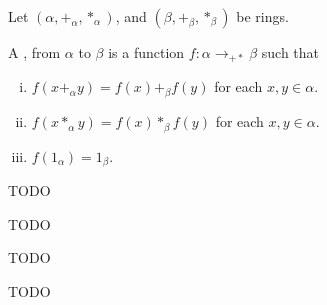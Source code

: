\begin{definition}
    \label{RingHom}

    Let $(\alpha, +_\alpha, *_\alpha)$, and $(\beta, +_\beta, *_\beta)$ be rings.
    
    A , from $\alpha$ to $\beta$ is a function $f : \alpha \to_{+*} \beta$ such that

	\begin{enumerate}[(i)]
		\item $f(x +_{\alpha} y) = f(x) +_{\beta} f(y)$ for each $x,y \in \alpha$.
		\item $f(x *_{\alpha} y) = f(x) *_{\beta} f(y)$ for each $x,y \in \alpha$.
		\item $f(1_{\alpha}) = 1_{\beta}$.
	\end{enumerate}

\end{definition}

\begin{definition}[FreeAlgebra]
    \label{FreeAlgebra}

    TODO

\end{definition}

\begin{definition}[LinearMap]
    \label{LinearMap}

    TODO

\end{definition}

\begin{definition}[RingQuot]
    \label{RingQuot}

    TODO

\end{definition}

\begin{definition}
    \label{TensorAlgebra_Rel}

    TODO

\end{definition}

